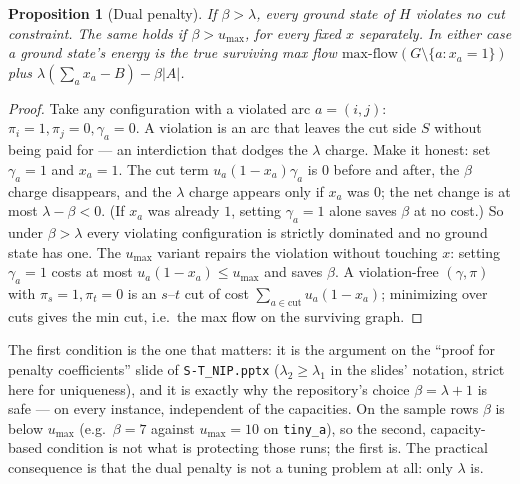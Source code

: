 \documentclass[11pt]{article}
\newcommand{\code}[1]{\texttt{#1}}
\newtheorem{proposition}{Proposition}
\begin{document}
\begin{proposition}[Dual penalty]
\label{prop:beta}
If $\beta > \lambda$, every ground state of $H$ violates no cut constraint. The same holds if $\beta > u_{\max}$, for every fixed $x$ separately. In either case a ground state's energy is the true surviving max flow $\text{max-flow}(G\setminus\{a : x_a=1\})$ plus $\lambda(\sum_a x_a - B) - \beta|A|$.
\end{proposition}
\begin{proof}
Take any configuration with a violated arc $a=(i,j)$: $\pi_i=1,\pi_j=0,\gamma_a=0$. A violation is an arc that leaves the cut side $S$ without being paid for --- an interdiction that dodges the $\lambda$ charge. Make it honest: set $\gamma_a=1$ and $x_a=1$. The cut term $u_a(1-x_a)\gamma_a$ is $0$ before and after, the $\beta$ charge disappears, and the $\lambda$ charge appears only if $x_a$ was $0$; the net change is at most $\lambda - \beta < 0$. (If $x_a$ was already $1$, setting $\gamma_a = 1$ alone saves $\beta$ at no cost.) So under $\beta>\lambda$ every violating configuration is strictly dominated and no ground state has one. The $u_{\max}$ variant repairs the violation without touching $x$: setting $\gamma_a=1$ costs at most $u_a(1-x_a)\le u_{\max}$ and saves $\beta$. A violation-free $(\gamma,\pi)$ with $\pi_s=1,\pi_t=0$ is an $s$--$t$ cut of cost $\sum_{a\in\text{cut}}u_a(1-x_a)$; minimizing over cuts gives the min cut, i.e.\ the max flow on the surviving graph.
\end{proof}

The first condition is the one that matters: it is the argument on the ``proof for penalty coefficients'' slide of \code{S-T\_NIP.pptx} ($\lambda_2 \ge \lambda_1$ in the slides' notation, strict here for uniqueness), and it is exactly why the repository's choice $\beta = \lambda + 1$ is safe --- on every instance, independent of the capacities. On the sample rows $\beta$ is below $u_{\max}$ (e.g.\ $\beta=7$ against $u_{\max}=10$ on \code{tiny\_a}), so the second, capacity-based condition is not what is protecting those runs; the first is. The practical consequence is that the dual penalty is not a tuning problem at all: only $\lambda$ is.
\end{document}
